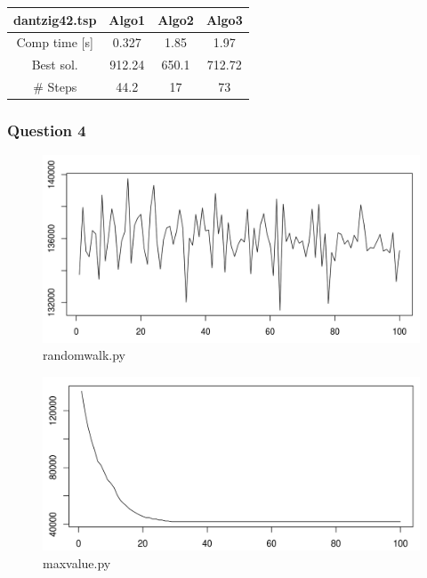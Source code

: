 \documentclass[a4paper,10pt]{article}
\begin{document}
\begin{center}
\begin{tabular}{|c|c|c|c|}
\hline 
dantzig42.tsp & Algo1 & Algo2 & Algo3 \\ 
\hline 
Comp time [s] & 0.327 & 1.85 & 1.97 \\ 
\hline 
Best sol. & 912.24 & 650.1 & 712.72 \\ 
\hline 
\# Steps & 44.2 & 17 & 73 \\ 
\hline 
\end{tabular} 
\end{center}

\subsubsection{Question 4}
\begin{center}
\begin{figure}[!ht]
		\includegraphics[scale=.4]{randomwalk.png}
	\caption{randomwalk.py}
\end{figure}
\end{center}
\begin{center}
\begin{figure}[!ht]
		\includegraphics[scale=.4]{maxvalue.png}
	\caption{maxvalue.py}
\end{figure}
\end{center}
\end{document}
